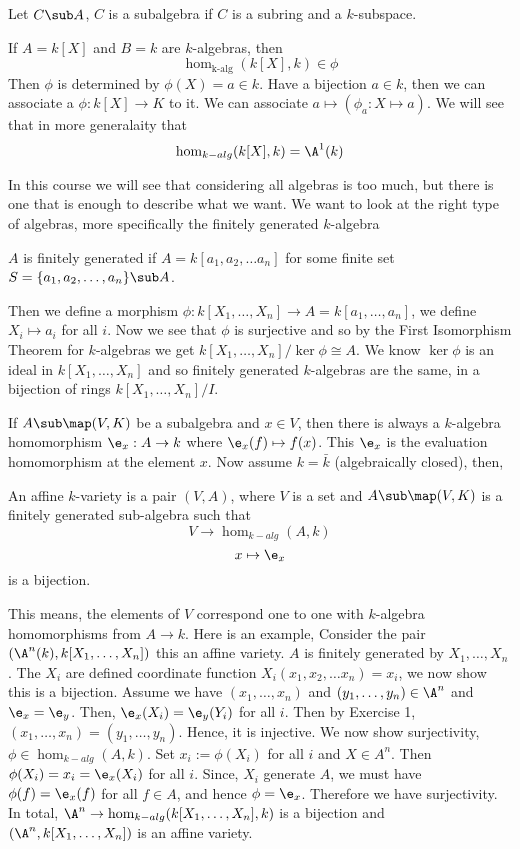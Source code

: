 \begin{ndefi}[Subalgebra]
  Let $C \sub A$, $C$ is a subalgebra if $C$ is a subring and a $k$-subspace.
\end{ndefi}

If $A = k[X]$ and $B = k$ are $k$-algebras, then
$$ \hom_{\text{k-alg}} (k[X], k) \in \phi $$
Then $\phi$ is determined by $\phi(X) = a \in k$. Have a bijection $a \in k$, then we can associate a $\phi : k[X] \to K$ to it. We can associate $a \mapsto (\phi_a : X \mapsto a)$. We will see that in more generalaity that
$$ \hom_{k-alg}(k[X], k) = \A^1(k) $$

In this course we will see that considering all algebras is too much, but there is one that is enough to describe what we want. We want to look at the right type of algebras, more specifically the finitely generated $k$-algebra
\begin{ndefi}
  $A$ is finitely generated if $A = k[a_{1}, a_2, \dots a_n]$ for some finite set $S = \{a_1, a_2, \dots, a_n\}\sub A$.
\end{ndefi}
Then we define a morphism $\phi : k[X_1, \dots, X_n] \to A = k[a_{1}, \dots, a_n]$, we define $X_i \mapsto a_i$ for all $i$. Now we see that $\phi$ is surjective and so by the First Isomorphism Theorem for $k$-algebras we get $k[X_1, \dots, X_n]/ \ker \phi \cong A$. We know $\ker \phi$ is an ideal in $k[X_1, \dots, X_n]$ and so finitely generated $k$-algebras are the same, in a bijection of rings $k[X_1, \dots, X_n]/ I$.

If $A \sub \map (V, K)$ be a subalgebra and $x \in V$, then there is always a $k$-algebra homomorphism $\e_x : A \to k$ where $\e_x (f) \mapsto f(x)$. This $\e_x$ is the evaluation homomorphism at the element $x$. Now assume $k = \bar k$ (algebraically closed), then,
\begin{ndefi}
  An affine $k$-variety is a pair $(V, A)$, where $V$ is a set and $A\sub \map(V, K)$ is a finitely generated sub-algebra such that
  $$ V \to \hom_{k-alg}(A, k) $$
  $$ x \mapsto \e_x $$
  is a bijection.
\end{ndefi}

This means, the elements of $V$ correspond one to one with $k$-algebra homomorphisms from $A \to k$. Here is an example, Consider the pair $(\A^n(k), k[X_1, \dots, X_n])$ this an affine variety. $A$ is finitely generated by $X_1, \dots, X_n$. The $X_i$ are defined coordinate function $X_i(x_1, x_2, \dots x_n) = x_i$, we now show this is a bijection. Assume we have $(x_1, \dots, x_n)$ and $(y_1, \dots, y_n) \in \A^n$ and $\e_x = \e_y$. Then, $\e_x(X_i) = \e_y(Y_i)$ for all $i$. Then by Exercise 1, $(x_1,  \dots, x_n) = (y_1, \dots, y_n)$. Hence, it is injective.
We now show surjectivity, $\phi \in \hom_{k-alg}(A, k)$. Set $x_i := \phi(X_i)$ for all $i$ and $X \in A^n$. Then $\phi(X_i) = x_i = \e_x(X_i)$ for all $i$. Since, $X_i$ generate $A$, we must have $\phi(f) = \e_x(f)$ for all $f \in A$, and hence $\phi = \e_x$. Therefore we have surjectivity. In total, $\A^n \to \hom_{k-alg}(k[X_1, \dots, X_n], k)$ is a bijection and $(\A^n, k[X_1, \dots, X_n])$ is an affine variety.

